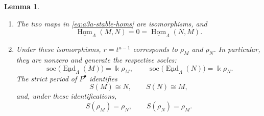 \documentclass[a4paper,11pt,reqno]{amsart}
\newtheorem{lemma}[lemma]{Lemma}
\theoremstyle{definition}
\theoremstyle{plain}
\numberwithin{equation}{section}
\newcommand{\Hom}{\operatorname{Hom}}
\newcommand{\End}{\operatorname{End}}
\newcommand{\kk}{\Bbbk}
\begin{document}
\begin{lemma}
\label{lem:a3a-rank-one}
\begin{enumerate}[label=\textup{(\arabic*)}]
\item The two maps in \eqref{eq:a3a-stable-homs} are isomorphisms, and
\[
 \underline{\Hom}_\Lambda(M,N)=0
 =\underline{\Hom}_\Lambda(N,M).
\]
\item Under these isomorphisms, \(r=t^{a-1}\) corresponds to
\(\rho_M\) and \(\rho_N\).  In particular, they are nonzero and generate
the respective socles:
\[
 \operatorname{soc}\bigl(\underline{\End}_\Lambda(M)\bigr)=\kk\rho_M,
 \qquad
 \operatorname{soc}\bigl(\underline{\End}_\Lambda(N)\bigr)=\kk\rho_N.
\]
The strict period of \(P^\bullet\) identifies
\[
 S(M)\cong N,\qquad S(N)\cong M,
\]
and, under these identifications,
\[
 S(\rho_M)=\rho_N,\qquad S(\rho_N)=\rho_M.
\]
\end{enumerate}
\end{lemma}
\end{document}
